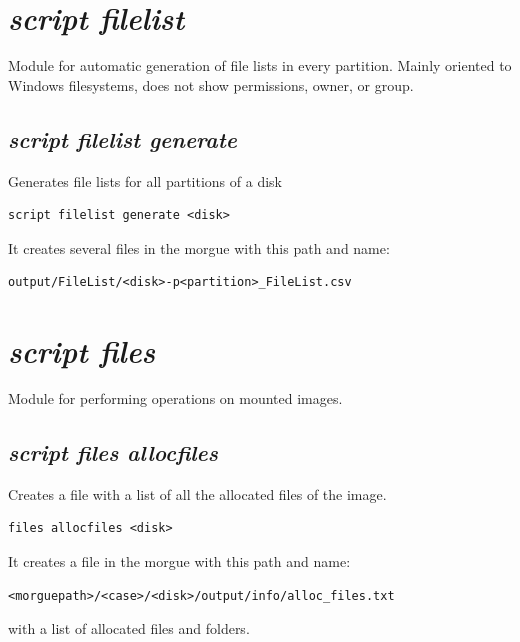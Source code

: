 \documentclass[a4paper,11pt,oneside]{report}
\begin{document}
\section{\emph{script filelist}}

Module for automatic generation of file lists in every partition. Mainly oriented to Windows filesystems, does not show permissions, owner, or group.

\subsection{\emph{script filelist generate}} 

Generates file lists for all partitions of a disk

\begin{verbatim}
script filelist generate <disk>
\end{verbatim}

It creates several files in the morgue with this path and name:

\begin{verbatim}
output/FileList/<disk>-p<partition>_FileList.csv
\end{verbatim}






\section{\emph{script files}}

Module for performing operations on mounted images.

\subsection{\emph{script files allocfiles}} 

Creates a file with a list of all the allocated files of the image.

\begin{verbatim}
files allocfiles <disk>
\end{verbatim}

It creates a file in the morgue with this path and name:

\begin{verbatim}
<morguepath>/<case>/<disk>/output/info/alloc_files.txt
\end{verbatim}

with a list of allocated files and folders.
\end{document}
